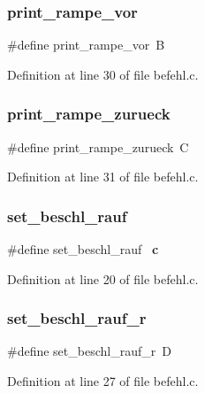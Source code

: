 \subsubsection{print\+\_\+rampe\+\_\+vor}
{\footnotesize\ttfamily \#define print\+\_\+rampe\+\_\+vor~\textquotesingle{}B\textquotesingle{}}



Definition at line 30 of file befehl.\+c.

\mbox{\label{befehl_8c_a008b4ed0f4c044060367d5358d7be234}} 
\subsubsection{print\+\_\+rampe\+\_\+zurueck}
{\footnotesize\ttfamily \#define print\+\_\+rampe\+\_\+zurueck~\textquotesingle{}C\textquotesingle{}}



Definition at line 31 of file befehl.\+c.

\mbox{\label{befehl_8c_ae44d99f25ff3d4de3278625871a5b2a8}} 
\subsubsection{set\+\_\+beschl\+\_\+rauf}
{\footnotesize\ttfamily \#define set\+\_\+beschl\+\_\+rauf~\textquotesingle{}\textbf{ c}\textquotesingle{}}



Definition at line 20 of file befehl.\+c.

\mbox{\label{befehl_8c_a4c4289f6b5b77dcca1337f9f35d2d2a2}} 
\subsubsection{set\+\_\+beschl\+\_\+rauf\+\_\+r}
{\footnotesize\ttfamily \#define set\+\_\+beschl\+\_\+rauf\+\_\+r~\textquotesingle{}D\textquotesingle{}}



Definition at line 27 of file befehl.\+c.


